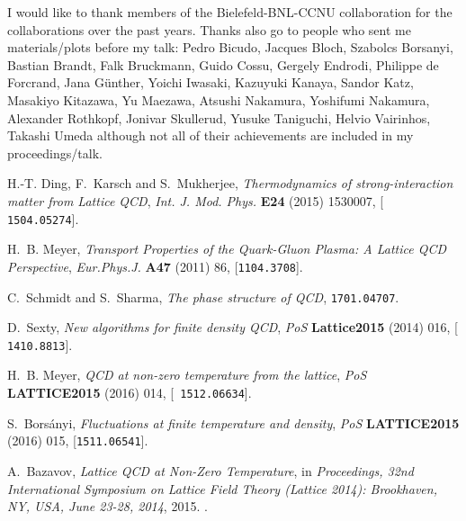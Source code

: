 \documentclass{PoS}
\begin{document}
I would like to thank members of the Bielefeld-BNL-CCNU collaboration for the collaborations over the past years.
Thanks also go to people who sent me materials/plots before my talk: Pedro Bicudo, Jacques Bloch, Szabolcs Borsanyi, Bastian Brandt, Falk Bruckmann, Guido Cossu, Gergely Endrodi, Philippe de Forcrand, Jana G\"unther, Yoichi Iwasaki, Kazuyuki Kanaya, Sandor Katz, Masakiyo Kitazawa, Yu Maezawa, Atsushi Nakamura, Yoshifumi Nakamura, Alexander Rothkopf, Jonivar Skullerud, Yusuke Taniguchi, Helvio Vairinhos, Takashi Umeda although not all of their achievements are included in my proceedings/talk. 
%
%
%

%

\providecommand{\href}[2]{#2}\begingroup\raggedright\begin{thebibliography}{100}

H.-T. Ding, F.~Karsch and S.~Mukherjee, \emph{{Thermodynamics of
  strong-interaction matter from Lattice QCD}},
  \href{http://dx.doi.org/10.1142/S0218301315300076}{\emph{Int. J. Mod. Phys.}
  {\bf E24} (2015) 1530007}, [\href{https://arxiv.org/abs/1504.05274}{{\tt
  1504.05274}}].

H.~B. Meyer, \emph{{Transport Properties of the Quark-Gluon Plasma: A Lattice
  QCD Perspective}},
  \href{http://dx.doi.org/10.1140/epja/i2011-11086-3}{\emph{Eur.Phys.J.} {\bf
  A47} (2011) 86}, [\href{https://arxiv.org/abs/1104.3708}{{\tt 1104.3708}}].

C.~Schmidt and S.~Sharma, \emph{{The phase structure of QCD}},
  \href{https://arxiv.org/abs/1701.04707}{{\tt 1701.04707}}.

D.~Sexty, \emph{{New algorithms for finite density QCD}}, {\emph{PoS} {\bf
  Lattice2015} (2014) 016}, [\href{https://arxiv.org/abs/1410.8813}{{\tt
  1410.8813}}].

H.~B. Meyer, \emph{{QCD at non-zero temperature from the lattice}}, {\emph{PoS}
  {\bf LATTICE2015} (2016) 014}, [\href{https://arxiv.org/abs/1512.06634}{{\tt
  1512.06634}}].

S.~Bors{\'a}nyi, \emph{{Fluctuations at finite temperature and density}},
  {\emph{PoS} {\bf LATTICE2015} (2016) 015},
  [\href{https://arxiv.org/abs/1511.06541}{{\tt 1511.06541}}].

A.~Bazavov, \emph{{Lattice QCD at Non-Zero Temperature}},  in
  \emph{{Proceedings, 32nd International Symposium on Lattice Field Theory
  (Lattice 2014): Brookhaven, NY, USA, June 23-28, 2014}}, 2015.
\newblock \href{https://arxiv.org/abs/1505.05543}{{\tt 1505.05543}}.


\end{thebibliography}
\end{document}
